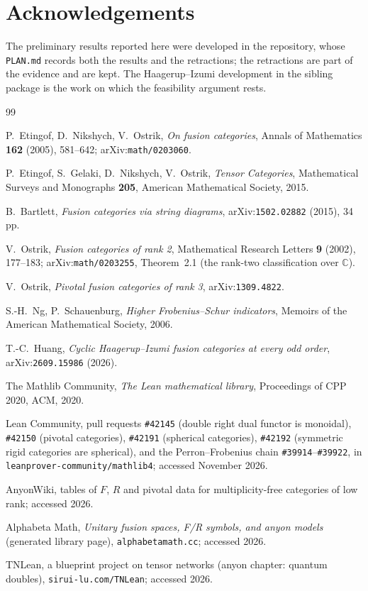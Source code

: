 \documentclass[11pt,a4paper]{article}
\theoremstyle{remark}
\newcommand{\code}[1]{\texttt{\detokenize{#1}}}
\newcommand{\Cx}{\mathbb{C}}
\begin{document}
\section*{Acknowledgements}

The preliminary results reported here were developed in the \code{fusion-category-lean}
repository, whose \texttt{PLAN.md} records both the results and the retractions; the retractions
are part of the evidence and are kept. The Haagerup--Izumi development in the sibling package is
the work on which the feasibility argument rests.

\begin{thebibliography}{99}

P.~Etingof, D.~Nikshych, V.~Ostrik,
\emph{On fusion categories},
Annals of Mathematics \textbf{162} (2005), 581--642; arXiv:\texttt{math/0203060}.

P.~Etingof, S.~Gelaki, D.~Nikshych, V.~Ostrik,
\emph{Tensor Categories},
Mathematical Surveys and Monographs \textbf{205}, American Mathematical Society, 2015.

B.~Bartlett,
\emph{Fusion categories via string diagrams},
arXiv:\texttt{1502.02882} (2015), 34 pp.

V.~Ostrik,
\emph{Fusion categories of rank 2},
Mathematical Research Letters \textbf{9} (2002), 177--183; arXiv:\texttt{math/0203255},
Theorem~2.1 (the rank-two classification over $\Cx$).

V.~Ostrik,
\emph{Pivotal fusion categories of rank 3},
arXiv:\texttt{1309.4822}.

S.-H.~Ng, P.~Schauenburg,
\emph{Higher Frobenius--Schur indicators},
Memoirs of the American Mathematical Society, 2006.

T.-C.~Huang,
\emph{Cyclic Haagerup--Izumi fusion categories at every odd order},
arXiv:\texttt{2609.15986} (2026).

The Mathlib Community,
\emph{The Lean mathematical library},
Proceedings of CPP 2020, ACM, 2020.

Lean Community,
pull requests \texttt{\#42145} (double right dual functor is monoidal),
\texttt{\#42150} (pivotal categories), \texttt{\#42191} (spherical categories),
\texttt{\#42192} (symmetric rigid categories are spherical), and the Perron--Frobenius chain
\texttt{\#39914}--\texttt{\#39922}, in \texttt{leanprover-community/mathlib4};
accessed November 2026.

AnyonWiki, tables of $F$, $R$ and pivotal data for multiplicity-free categories of low rank;
accessed 2026.

Alphabeta Math, \emph{Unitary fusion spaces, F/R symbols, and anyon models} (generated library
page), \texttt{alphabetamath.cc}; accessed 2026.

TNLean, a blueprint project on tensor networks (anyon chapter: quantum doubles),
\texttt{sirui-lu.com/TNLean}; accessed 2026.

\end{thebibliography}
\appendix
\end{document}
